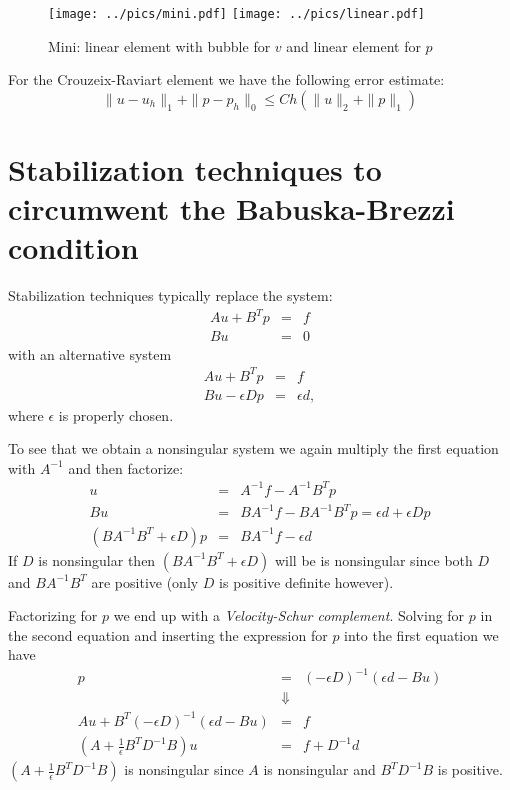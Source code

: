 \documentclass[a4paper,11pt]{amsart}
\begin{document}
\begin{figure}[h]
\begin{center}
\label{fig:mini}
\texttt{[image: ../pics/mini.pdf]}
\texttt{[image: ../pics/linear.pdf]}
\caption{Mini: linear element with bubble for $v$ and linear element for $p$}
\end{center}
\end{figure}

For the Crouzeix-Raviart element we have the following error estimate:
\[\|u-u_h\|_1 + \|p-p_h\|_0 \leq Ch (\|u\|_{2} + \|p\|_{1})\]

\section{Stabilization techniques to circumwent the Babuska-Brezzi condition}
Stabilization techniques typically replace the system:
\begin{eqnarray*}
Au + B^Tp &=& f \\
Bu &=& 0
\end{eqnarray*}
with an alternative system
\begin{eqnarray*}
Au + B^Tp &=& f \\
Bu -\epsilon Dp &=& \epsilon d ,
\end{eqnarray*}
where $\epsilon$ is properly chosen.

To see that we obtain a nonsingular system we again multiply the first
equation with $A^{-1}$ and then factorize:
\begin{eqnarray*}
u &=& A^{-1}f - A^{-1}B^Tp \\
Bu &=& BA^{-1}f - BA^{-1}B^Tp  = \epsilon d + \epsilon Dp \\
(BA^{-1}B^T + \epsilon D)p &=& BA^{-1}f - \epsilon d
\end{eqnarray*}
If $D$ is nonsingular then
$(BA^{-1}B^T + \epsilon D)$ will be is nonsingular since both $D$ and $BA^{-1}B^T$ are positive (only $D$ is positive definite however).

Factorizing for $p$ we end up with a \emph{Velocity-Schur complement}. Solving for $p$ in the second equation and inserting the expression for $p$ into the first equation we have
\begin{eqnarray*}
p &=& (-\epsilon D)^{-1}(\epsilon d - Bu)\\
&\Downarrow&\\
Au + B^T(-\epsilon D)^{-1}(\epsilon d-Bu) &=& f\\
(A + \frac{1}{\epsilon}B^TD^{-1}B)u &=& f + D^{-1}d
\end{eqnarray*}
$(A + \frac{1}{\epsilon}B^TD^{-1}B)$ is nonsingular since $A$ is nonsingular and $B^TD^{-1}B$ is positive.
\end{document}
